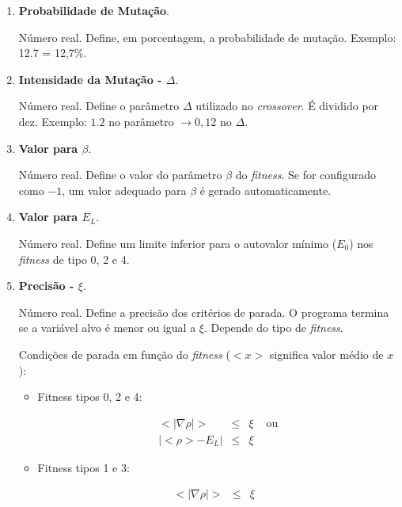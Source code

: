 \begin{enumerate}
		\item \textbf{Probabilidade de Mutação}.
		
		Número real. Define, em porcentagem, a probabilidade de mutação. Exemplo: 12.7 = 12,7\%.
		
		\item \textbf{Intensidade da Mutação - $\Delta$}.
		
			Número real. Define o parâmetro $\Delta$ utilizado no \emph{crossover}. É dividido por dez. Exemplo: $1.2$ no parâmetro $\rightarrow 0,12$ no $\Delta$.
		
		\item \textbf{Valor para $\beta$}.
		
		Número real. Define o valor do parâmetro $\beta$ do \emph{fitness}. Se for configurado como $-1$, um valor adequado para $\beta$ é gerado automaticamente.
		
		\item \textbf{Valor para $E_L$}.
		
		Número real. Define um limite inferior para o autovalor mínimo ($E_0$) nos \emph{fitness} de tipo 0, 2 e 4. 
		
		\item \textbf{Precisão - $\xi$}.
		
		Número real. Define a precisão dos critérios de parada. O programa termina se a variável alvo é menor ou igual a $\xi$. Depende do tipo de \emph{fitness}.
		
		Condições de parada em função do \emph{fitness} ($<x>$ significa valor médio de $x$):
				
		\begin{itemize}
			\item Fitness tipos 0, 2 e 4:
						
			\begin{equation}\label{eq:criterioParada024}
				\begin{array}{ccll}
				<|\nabla \rho|> & \leq & \xi & \mbox{  ou} \\
				| <\rho> - E_L | & \leq & \xi &
				\end{array}
			\end{equation}
			
			
			\item Fitness tipos 1 e 3:
			
			\begin{equation}\label{eq:criterioParada13}
				\begin{array}{ccll}
					<|\nabla \rho|> & \leq & \xi &
				\end{array}
			\end{equation}
			

\end{itemize}
\end{enumerate}
